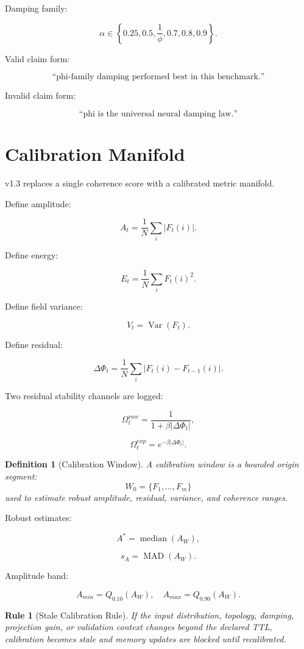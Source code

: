 \documentclass[12pt]{article}
\newtheorem{definition}{Definition}
\newtheorem{rulebox}{Rule}
\begin{document}
Damping family:

\[
\alpha\in\left\{0.25,0.5,\frac{1}{\phi},0.7,0.8,0.9\right\}.
\]

Valid claim form:

\[
\text{``phi-family damping performed best in this benchmark.''}
\]

Invalid claim form:

\[
\text{``phi is the universal neural damping law.''}
\]

\section{Calibration Manifold}

v1.3 replaces a single coherence score with a calibrated metric manifold.

Define amplitude:

\[
A_t=\frac{1}{N}\sum_i |F_t(i)|.
\]

Define energy:

\[
E_t=\frac{1}{N}\sum_i F_t(i)^2.
\]

Define field variance:

\[
V_t=\operatorname{Var}(F_t).
\]

Define residual:

\[
\Delta\Phi_t=\frac{1}{N}\sum_i |F_t(i)-F_{t-1}(i)|.
\]

Two residual stability channels are logged:

\[
\Omega^{raw}_t=\frac{1}{1+\beta|\Delta\Phi_t|},
\]

\[
\Omega^{exp}_t=e^{-\beta|\Delta\Phi_t|}.
\]

\begin{definition}[Calibration Window]
A calibration window is a bounded origin segment:
\[
W_0=\{F_1,\ldots,F_m\}
\]
used to estimate robust amplitude, residual, variance, and coherence ranges.
\end{definition}

Robust estimates:

\[
A^*=\operatorname{median}(A_W),
\]

\[
s_A=\operatorname{MAD}(A_W).
\]

Amplitude band:

\[
A_{min}=Q_{0.10}(A_W),
\quad
A_{max}=Q_{0.90}(A_W).
\]

\begin{rulebox}[Stale Calibration Rule]
If the input distribution, topology, damping, projection gain, or validation
context changes beyond the declared TTL, calibration becomes stale and memory
updates are blocked until recalibrated.
\end{rulebox}
\end{document}
